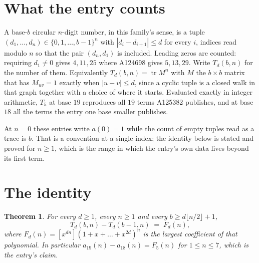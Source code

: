 \documentclass[11pt,a4paper]{article}
\theoremstyle{plain}
\newtheorem{theorem}{Theorem}
\theoremstyle{definition}
\begin{document}
\section{What the entry counts}

A base-$b$ circular $n$-digit number, in this family's sense, is a tuple
$(d_1,\dots,d_n)\in\{0,1,\dots,b-1\}^{n}$ with $|d_i-d_{i+1}|\le d$ for every $i$, indices
read modulo $n$ so that the pair $(d_n,d_1)$ is included. Leading zeros are counted: requiring
$d_1\ne0$ gives $4,11,25$ where A124698 gives $5,13,29$. Write $T_d(b,n)$ for the number of
them. Equivalently $T_d(b,n)=\operatorname{tr}M^{n}$ with $M$ the $b\times b$ matrix that has
$M_{uv}=1$ exactly when $|u-v|\le d$, since a cyclic tuple is a closed walk in that graph
together with a choice of where it starts. Evaluated exactly in integer arithmetic, $T_{5}$
at base $19$ reproduces all $19$ terms A125382 publishes, and at base $18$ all the
terms the entry one base smaller publishes.

At $n=0$ these entries write $a(0)=1$ while the count of empty tuples read as a trace is $b$.
That is a convention at a single index; the identity below is stated and proved for $n\ge1$,
which is the range in which the entry's own data lives beyond its first term.

\section{The identity}

\begin{theorem}
For every $d\ge1$, every $n\ge1$ and every $b\ge d\lfloor n/2\rfloor+1$,
\[
T_d(b,n)-T_d(b-1,n)\;=\;F_d(n),
\]
where $F_d(n)=[x^{dn}](1+x+\dots+x^{2d})^{n}$ is the largest coefficient of that
polynomial. In particular $a_{19}(n)-a_{18}(n)=F_{5}(n)$ for $1\le n\le7$, which
is the entry's claim.
\end{theorem}
\end{document}

